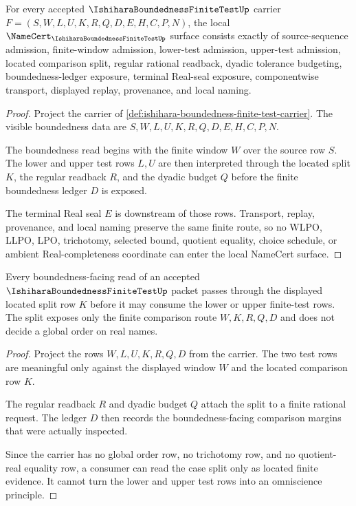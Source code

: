 \begin{theorem}
\label{thm:ishihara-boundedness-namecert-obligations}
For every accepted $\IshiharaBoundednessFiniteTestUp$ carrier $F=(S,W,L,U,K,R,Q,D,E,H,C,P,N)$, the local $\NameCert_{\IshiharaBoundednessFiniteTestUp}$ surface consists exactly of source-sequence admission, finite-window admission, lower-test admission, upper-test admission, located comparison split, regular rational readback, dyadic tolerance budgeting, boundedness-ledger exposure, terminal Real-seal exposure, componentwise transport, displayed replay, provenance, and local naming.
\end{theorem}
\begin{proof}
Project the carrier of \autoref{def:ishihara-boundedness-finite-test-carrier}. The visible boundedness data are $S,W,L,U,K,R,Q,D,E,H,C,P,N$.

The boundedness read begins with the finite window $W$ over the source row $S$. The lower and upper test rows $L,U$ are then interpreted through the located split $K$, the regular readback $R$, and the dyadic budget $Q$ before the finite boundedness ledger $D$ is exposed.

The terminal Real seal $E$ is downstream of those rows. Transport, replay, provenance, and local naming preserve the same finite route, so no WLPO, LLPO, LPO, trichotomy, selected bound, quotient equality, choice schedule, or ambient Real-completeness coordinate can enter the local NameCert surface.
\end{proof}

\begin{theorem}
\label{thm:ishihara-boundedness-located-case-split}
Every boundedness-facing read of an accepted $\IshiharaBoundednessFiniteTestUp$ packet passes through the displayed located split row $K$ before it may consume the lower or upper finite-test rows. The split exposes only the finite comparison route $W,K,R,Q,D$ and does not decide a global order on real names.
\end{theorem}
\begin{proof}
Project the rows $W,L,U,K,R,Q,D$ from the carrier. The two test rows are meaningful only against the displayed window $W$ and the located comparison row $K$.

The regular readback $R$ and dyadic budget $Q$ attach the split to a finite rational request. The ledger $D$ then records the boundedness-facing comparison margins that were actually inspected.

Since the carrier has no global order row, no trichotomy row, and no quotient-real equality row, a consumer can read the case split only as located finite evidence. It cannot turn the lower and upper test rows into an omniscience principle.
\end{proof}

